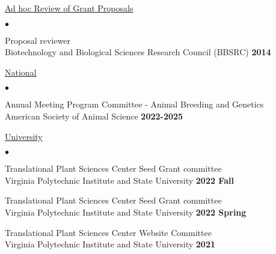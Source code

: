 \documentclass[margin,line,10pt]{res}
\newenvironment{list2}{
  \begin{list}{$\bullet$}{%
      \setlength{\itemsep}{0in}
      \setlength{\parsep}{0in} \setlength{\parskip}{0in}
      \setlength{\topsep}{0in} \setlength{\partopsep}{0in} 
      \setlength{\leftmargin}{0.2in}}}{\end{list}}
\begin{document}
\begin{resume}

\begin{flushleft}
\hspace{0.3cm} \underline{Ad hoc Review of Grant Proposals}
\end{flushleft}
\begin{list2}
\item Proposal reviewer  \\
  Biotechnology and Biological Sciences Research Council (BBSRC) \hfill \textbf{2014}  \\
\end{list2}



\begin{flushleft}
  \hspace{0.3cm} \underline{National}
\end{flushleft}
\begin{list2}
\item Annual Meeting Program Committee - Animal Breeding and Genetics   \\
American Society of Animal Science   \hfill \textbf{2022-2025}\\

\end{list2}


\begin{flushleft}
  \hspace{0.3cm} \underline{University}
\end{flushleft}
\begin{list2}

    \item Translational Plant Sciences Center Seed Grant committee \\
  Virginia Polytechnic Institute and State University  \hfill \textbf{2022 Fall}\\

  \vspace{0.3cm}
  
  \item Translational Plant Sciences Center Seed Grant committee \\
  Virginia Polytechnic Institute and State University  \hfill \textbf{2022 Spring}\\

  \vspace{0.3cm}

\item Translational Plant Sciences Center Website Committee \\
  Virginia Polytechnic Institute and State University  \hfill \textbf{2021}\\


\end{list2}
\end{resume}
\end{document}
